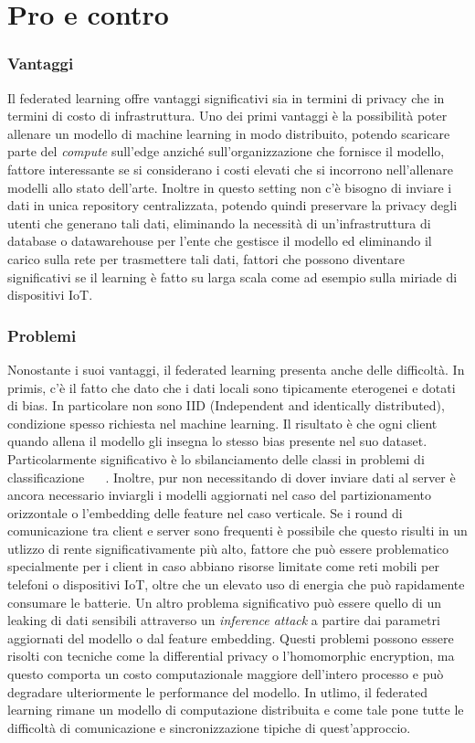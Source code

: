 \section{Pro e contro}
\subsubsection{Vantaggi}
Il federated learning offre vantaggi significativi sia in termini di 
privacy che in termini di costo di infrastruttura. 
Uno dei primi  vantaggi è la possibilità poter allenare un modello 
di machine learning in modo distribuito, potendo scaricare parte del 
\textit{compute} sull'edge anziché sull'organizzazione che fornisce 
il modello, fattore interessante se si considerano i costi elevati che 
si incorrono nell'allenare modelli allo stato dell'arte.
Inoltre in questo setting non c'è bisogno di inviare i dati in unica 
repository centralizzata, potendo quindi preservare la privacy degli
utenti che generano tali dati, eliminando la necessità di 
un'infrastruttura di database o datawarehouse per l'ente che gestisce
il modello ed eliminando il carico sulla rete per trasmettere tali
dati, fattori che possono diventare significativi se il learning è
fatto su larga scala come ad esempio sulla miriade di dispositivi IoT.

\subsubsection{Problemi}
Nonostante i suoi vantaggi, il federated learning presenta anche delle 
difficoltà.
In primis, c'è il fatto che dato che i dati locali sono tipicamente 
eterogenei e dotati di bias. In particolare non sono IID (Independent
and identically distributed), condizione spesso richiesta nel 
machine learning. Il risultato è che ogni client quando allena il modello 
gli insegna lo stesso bias presente nel suo dataset. Particolarmente
significativo è lo sbilanciamento delle classi in problemi di 
classificazione ~\cite{zhao2018flniid} ~\cite{xiao2021flci}.
Inoltre, pur non necessitando di dover inviare dati al server è
ancora necessario inviargli i modelli aggiornati nel caso del 
partizionamento orizzontale o l'embedding delle feature nel caso 
verticale. Se i round di comunicazione tra client e server sono 
frequenti è possibile che questo risulti in un utlizzo di rente 
significativamente più alto, fattore che può essere problematico
specialmente per i client in caso abbiano risorse limitate come reti 
mobili per telefoni o dispositivi IoT, oltre che un elevato uso di 
energia che può rapidamente consumare le batterie.
Un altro problema significativo può essere quello di un leaking di 
dati sensibili attraverso un \textit{inference attack} a partire 
dai parametri aggiornati del modello o dal feature embedding. Questi 
problemi possono essere risolti con tecniche come la differential 
privacy o l'homomorphic encryption, ma questo comporta un costo 
computazionale maggiore dell'intero processo e può degradare ulteriormente 
le performance del modello.
In utlimo, il federated learning rimane un modello di computazione 
distribuita e come tale pone tutte le difficoltà di comunicazione e 
sincronizzazione tipiche di quest'approccio.
